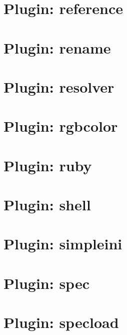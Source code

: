 \let\mypdfximage\pdfximage\def\pdfximage{\immediate\mypdfximage}\documentclass[twoside]{book}
\newcommand{\+}{\discretionary{\mbox{\scriptsize$\hookleftarrow$}}{}{}}
\begin{document}
\chapter{Plugin\+: reference}
\label{md_src_plugins_reference_README}

\chapter{Plugin\+: rename}
\label{md_src_plugins_rename_README}

\chapter{Plugin\+: resolver}
\label{md_src_plugins_resolver_README}

\chapter{Plugin\+: rgbcolor}
\label{md_src_plugins_rgbcolor_README}

\chapter{Plugin\+: ruby}
\label{md_src_plugins_ruby_README}

\chapter{Plugin\+: shell}
\label{md_src_plugins_shell_README}

\chapter{Plugin\+: simpleini}
\label{md_src_plugins_simpleini_README}

\chapter{Plugin\+: spec}
\label{md_src_plugins_spec_README}

\chapter{Plugin\+: specload}
\label{md_src_plugins_specload_README}

\end{document}
